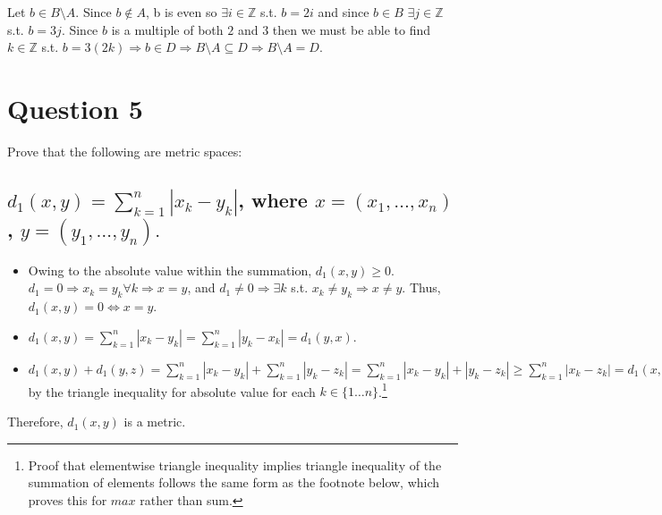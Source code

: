 \documentclass[11pt]{article} %
\begin{document}
Let $ b \in B \setminus A$. Since $b \notin A$, b is even so $\exists i \in \mathbb{Z}$ s.t. $ b = 2i$ and since $b \in B$ $ \exists j \in \mathbb{Z}$ s.t. $ b = 3j$. Since $b$ is a multiple of both $2$ and $3$ then we must be able to find $k \in \mathbb{Z}$ s.t. $b = 3(2k) \Rightarrow b \in D \Rightarrow B \setminus A \subseteq D \Rightarrow B \setminus A = D.$

\section{Question 5}
Prove that the following are metric spaces:
\subsection{$d_1(x,y) = \sum_{k=1}^{n} |x_k - y_k| $, where $x = (x_1,\dots ,x_n)$, $y = (y_1,\dots ,y_n).$}
\begin{itemize}
\item
Owing to the absolute value within the summation, $d_1(x,y) \geq 0$. $d_1 = 0 \Rightarrow x_k = y_k \forall k \Rightarrow x = y$, and $d_1 \neq 0 \Rightarrow \exists k$ s.t. $x_k \neq y_k \Rightarrow x \neq y$. Thus, $d_1(x,y) = 0 \iff x = y$. 
\item
$d_1(x,y) =  \sum_{k=1}^{n} |x_k - y_k|  =  \sum_{k=1}^{n} |y_k - x_k| = d_1(y,x)$.
\item
 $d_1(x,y) + d_1(y,z) =  \sum_{k=1}^{n} |x_k - y_k|+  \sum_{k=1}^{n} |y_k - z_k| = \sum_{k=1}^{n} |x_k - y_k|+ |y_k - z_k| \geq \sum_{k=1}^{n} |x_k - z_k| = d_1(x,z)$ by the triangle inequality for absolute value for each $k \in \{ 1 \dots n \}$.\footnote{Proof that elementwise triangle inequality implies triangle inequality of the summation of elements follows the same form as the footnote below, which proves this for $max$ rather than sum.}
\end{itemize}
Therefore, $d_1(x,y)$ is a metric.
\end{document}
